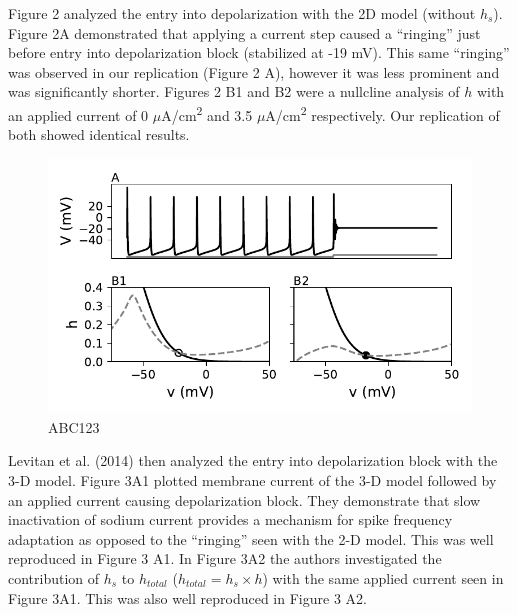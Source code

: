 Figure 2 analyzed the entry into depolarization with the 2D model (without $h_s$). Figure 2A demonstrated that applying a current step caused a “ringing” just before entry into depolarization block (stabilized at -19 mV). This same “ringing” was observed in our replication (Figure 2 A), however it was less prominent and was significantly shorter. Figures 2 B1 and B2 were a nullcline analysis of $h$ with an applied current of 0 $\mu$A/cm\textsuperscript{2} and 3.5 $\mu$A/cm\textsuperscript{2} respectively. Our replication of both showed identical results.\\ 

\begin{figure}
	\centering
	\includegraphics[scale=0.7]{../figures/figure_2.pdf}
	\caption{ABC123}
	\label{fig:2}
\end{figure}

Levitan et al. (2014) then analyzed the entry into depolarization block with the 3-D model. Figure 3A1 plotted membrane current of the 3-D model followed by an applied current causing depolarization block. They demonstrate that slow inactivation of sodium current provides a mechanism for spike frequency adaptation as opposed to the “ringing” seen with the 2-D model. This was well reproduced in Figure 3 A1. In Figure 3A2 the authors investigated the contribution of $h_s$ to $h_{total}$ ($h_{total}= h_{s} \times h$) with the same applied current seen in Figure 3A1. This was also well reproduced in Figure 3 A2. \\

